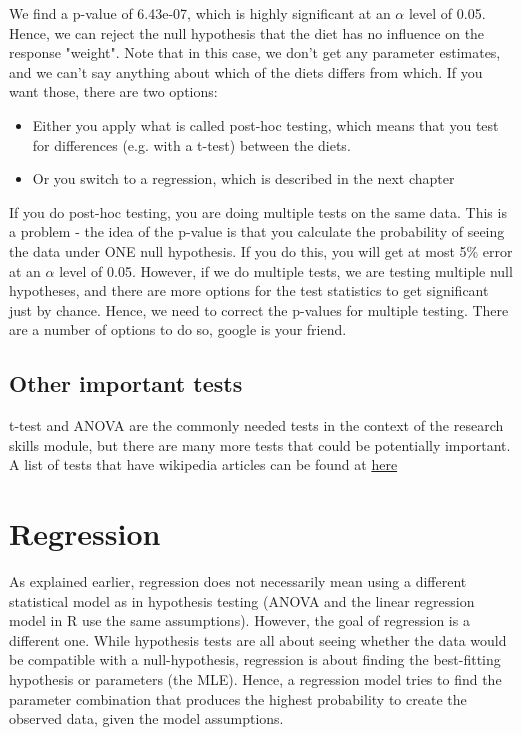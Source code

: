 \documentclass[a4paper,twoside]{tufte-book}\usepackage[]{graphicx}\usepackage[]{color}
\begin{document}
{We find a p-value of  6.43e-07, which is highly significant at an $\alpha$ level of 0.05. Hence, we can reject the null hypothesis that the diet has no influence on the response "weight". Note that in this case, we don't get any parameter estimates, and we can't say anything about which of the diets differs from which. If you want those, there are two options:

\begin{itemize}
\item Either you apply what is called post-hoc testing, which means that you test for differences (e.g. with a t-test) between the diets.
\item Or you switch to a regression, which is described in the next chapter
\end{itemize}

If you do post-hoc testing, you are doing multiple tests on the same data. This is a problem - the idea of the p-value is that you calculate the probability of seeing the data under ONE null hypothesis. If you do this, you will get at most 5\% error at an $\alpha$ level of 0.05.  However, if we do multiple tests, we are testing multiple null hypotheses, and there are more options for the test statistics to get significant just by chance. Hence, we need to correct the p-values for multiple testing. There are a number of options to do so, google is your friend. 

\subsection{Other important tests}

t-test and ANOVA are the commonly needed tests in the context of the research skills module, but there are many more tests that could be potentially important. A list of tests that have wikipedia articles can be found at \href{http://en.wikipedia.org/wiki/Category:Statistical_tests}{here} 


\section{Regression}

As explained earlier, regression does not necessarily mean using a different statistical model as in hypothesis testing (ANOVA and the linear regression model in R use the same assumptions). However, the goal of regression is a different one. While hypothesis tests are all about seeing whether the data would be compatible with a null-hypothesis, regression is about finding the best-fitting hypothesis or parameters (the MLE). Hence, a regression model tries to find the parameter combination that produces the highest probability to create the observed data, given the model assumptions.

}
\end{document}
